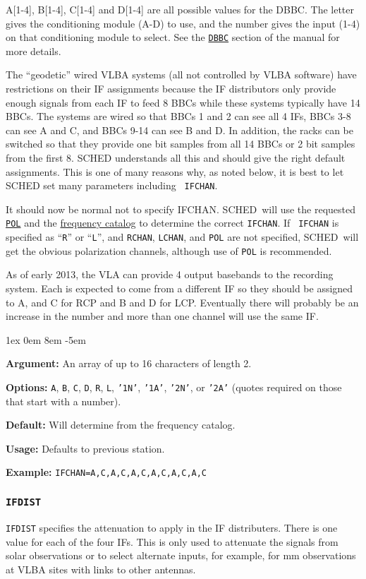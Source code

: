 \documentclass{report}
\newcommand{\schedb}{{\sc SCHED~}}
\newcommand{\rcwbox}[5]{
  \begin{list}{}{\parsep 1ex  \itemsep 0em
                 \leftmargin 8em  \itemindent -5em }
    \item {\bf Argument:} #1
    \item {\bf Options:}  #2
    \item {\bf Default:}  #3
    \item {\bf Usage:}    #4
    \item {\bf Example:}  #5
  \end{list}
}
\begin{document}
A[1-4], B[1-4], C[1-4] and D[1-4] are all possible values for
the DBBC. The letter gives the conditioning module (A-D) to use, and the
number gives the input (1-4) on that conditioning module to select. See
the 
{\hyperref[SSEC:DBBC]{{\tt DBBC}}} section of the manual for more
details.

The ``geodetic'' wired VLBA systems (all not controlled by VLBA
software) have restrictions on their IF assignments because the IF
distributors only provide enough signals from each IF to feed 8 BBCs
while these systems typically have 14 BBCs.  The systems are wired so
that BBCs 1 and 2 can see all 4 IFs, BBCs 3-8 can see A and C, and
BBCs 9-14 can see B and D.  In addition, the racks can be switched so
that they provide one bit samples from all 14 BBCs or 2 bit samples
from the first 8.  SCHED understands all this and should give the
right default assignments.  This is one of many reasons why, as noted
below, it is best to let SCHED set many parameters including {\tt
IFCHAN}.

It should now be normal not to specify IFCHAN.  \schedb will use the
requested 
{\hyperref[SP:POL]{{\tt POL}}} and the 
{\hyperref[SEC:FRQCAT]{frequency catalog}}
to determine the correct {\tt IFCHAN}.  If {\tt
IFCHAN} is specified as ``{\tt R}'' or ``{\tt L}'', and {\tt RCHAN},
{\tt LCHAN}, and {\tt POL} are not specified, \schedb will get the
obvious polarization channels, although use of {\tt POL} is
recommended.

As of early 2013, the VLA can provide 4 output basebands to the recording
system.  Each is expected to come from a different IF so they should
be assigned to A, and C for RCP and B and D for LCP.  Eventually there
will probably be an increase in the number and more than one channel
will use the same IF.

\rcwbox
{An array of up to 16 characters of length 2.}
{{\tt A}, {\tt B}, {\tt C}, {\tt D}, {\tt R}, {\tt L},
{\tt '1N'}, {\tt '1A'}, {\tt '2N'}, or {\tt '2A'} (quotes required
on those that start with a number).}
{Will determine from the frequency catalog.}
{Defaults to previous station.}
{{\tt IFCHAN=A,C,A,C,A,C,A,C,A,C,A,C}}


\subsubsection{\label{SP:IFDIST}{\tt IFDIST}}

{\tt IFDIST} specifies the attenuation to apply in the IF distributers.
There is one value for each of the four IFs. This is only used to
attenuate the signals from solar observations or to select alternate
inputs, for example, for mm observations at VLBA sites with links to
other antennas.
\end{document}
